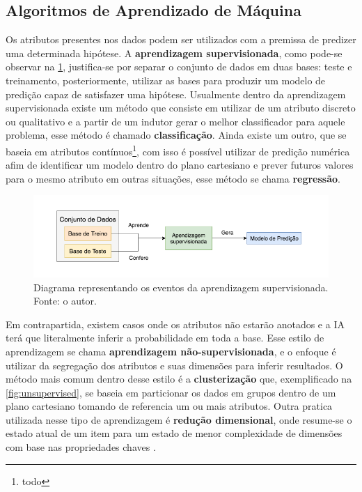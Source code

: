 \subsection{Algoritmos de Aprendizado de Máquina}
Os atributos presentes nos dados podem ser utilizados com a premissa de predizer uma determinada hipótese. A \textbf{aprendizagem supervisionada}, como pode-se observar na \ref{fig:supervisedlearning}, justifica-se por separar o conjunto de dados em duas bases: teste e treinamento, posteriormente, utilizar as bases para produzir um modelo de predição capaz de satisfazer uma hipótese. Usualmente dentro da aprendizagem supervisionada existe um método que consiste em utilizar de um atributo discreto ou qualitativo e a partir de um indutor gerar o melhor classificador para aquele problema, esse método é chamado \textbf{classificação}. Ainda existe um outro, que se baseia em atributos contínuos\footnote{todo}, com isso é possível utilizar de predição numérica afim de identificar um modelo dentro do plano cartesiano e prever futuros valores para o mesmo atributo em outras situações, esse método se chama \textbf{regressão}. \cite{hastie2009unsupervised, russell2003artificial}

\begin{figure}[H]
    \centering
    \includegraphics[width=.8\textwidth]{imagens/supervisedlearning.png}
    \caption{Diagrama representando os eventos da aprendizagem supervisionada. Fonte: o autor.}
    \label{fig:supervisedlearning}
\end{figure}

Em contrapartida, existem casos onde os atributos não estarão anotados e a IA terá que literalmente inferir a probabilidade em toda a base. Esse estilo de aprendizagem se chama \textbf{aprendizagem não-supervisionada}, e o enfoque é utilizar da segregação dos atributos e suas dimensões para inferir resultados. O método mais comum dentro desse estilo é a \textbf{clusterização} que, exemplificado na \ref{fig:unsupervised}, se baseia em particionar os dados em grupos dentro de um plano cartesiano tomando de referencia um ou mais atributos. Outra pratica utilizada nesse tipo de aprendizagem é \textbf{redução dimensional}, onde resume-se o estado atual de um item para um estado de menor complexidade de dimensões com base nas propriedades chaves \cite{hastie2009unsupervised, mohri2012foundations}.


